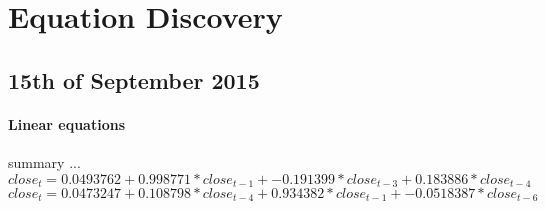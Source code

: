 \documentclass[13pt]{report}
\begin{document}
\section{Equation Discovery}
\subsection{15th of September 2015}
\paragraph{Linear equations}\hfill \break
summary ...
\begin{equation} 
close_{t} = 0.0493762 + 0.998771 * close_{t-1} + -0.191399 * close_{t-3} + 0.183886 * close_{t-4} 
\label{Equation 5.1}
\end{equation}
\begin{equation} 
close_{t} = 0.0473247 + 0.108798 * close_{t-4} + 0.934382 * close_{t-1} + -0.0518387 * close_{t-6}  
\label{Equation 5.2}
\end{equation}
\end{document}
